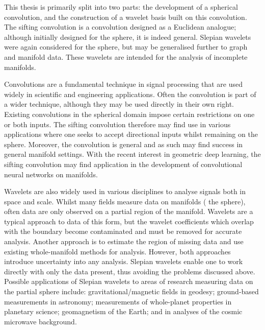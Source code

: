 \begin{impactstatement} %
	This thesis is primarily split into two parts: the development of a spherical convolution, and the construction of a wavelet basis built on this convolution.
	The sifting convolution is a convolution designed as a Euclidean analogue; although initially designed for the sphere, it is indeed general.
	Slepian wavelets were again considered for the sphere, but may be generalised further to graph and manifold data.
	These wavelets are intended for the analysis of incomplete manifolds.

	Convolutions are a fundamental technique in signal processing that are used widely in scientific and engineering applications.
	Often the convolution is part of a wider technique, although they may be used directly in their own right.
	Existing convolutions in the spherical domain impose certain restrictions on one or both inputs.
	The sifting convolution therefore may find use in various applications where one seeks to accept directional inputs whilst remaining on the sphere.
	Moreover, the convolution is general and as such may find success in general manifold settings.
	With the recent interest in geometric deep learning, the sifting convolution may find application in the development of convolutional neural networks on manifolds.

	Wavelets are also widely used in various disciplines to analyse signals both in space and scale.
	Whilst many fields measure data on manifolds (\ie{} the sphere), often data are only observed on a partial region of the manifold.
	Wavelets are a typical approach to data of this form, but the wavelet coefficients which overlap with the boundary become contaminated and must be removed for accurate analysis.
	Another approach is to estimate the region of missing data and use existing whole-manifold methods for analysis.
	However, both approaches introduce uncertainty into any analysis.
	Slepian wavelets enable one to work directly with only the data present, thus avoiding the problems discussed above.
	Possible applications of Slepian wavelets to areas of research measuring data on the partial sphere include: gravitational/magnetic fields in geodesy; ground-based measurements in astronomy; measurements of whole-planet properties in planetary science; geomagnetism of the Earth; and in analyses of the cosmic microwave background.
\end{impactstatement}

